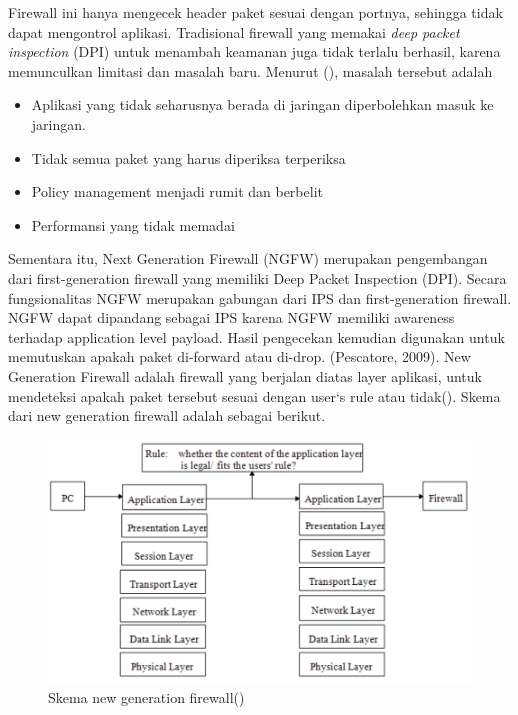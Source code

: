 Firewall ini hanya mengecek header paket sesuai dengan portnya, sehingga tidak dapat mengontrol aplikasi. Tradisional firewall yang memakai \textit{deep packet inspection} (DPI) untuk menambah keamanan juga tidak terlalu berhasil, karena memunculkan limitasi dan masalah baru. Menurut (\cite{miller2011next}), masalah tersebut adalah
\begin{itemize}
	\item Aplikasi yang tidak seharusnya berada di jaringan diperbolehkan masuk ke jaringan.
	\item Tidak semua paket yang harus diperiksa terperiksa
	\item Policy management menjadi rumit dan berbelit
	\item Performansi yang tidak memadai 
\end{itemize}

Sementara itu, Next Generation Firewall (NGFW) merupakan pengembangan dari first-generation firewall yang memiliki Deep Packet Inspection (DPI). Secara fungsionalitas NGFW merupakan gabungan dari IPS dan first-generation firewall. NGFW dapat dipandang sebagai IPS karena NGFW memiliki awareness terhadap application level payload. Hasil pengecekan kemudian digunakan untuk memutuskan apakah paket di-forward atau di-drop. (Pescatore, 2009). New Generation Firewall adalah firewall yang berjalan diatas layer aplikasi, untuk mendeteksi apakah paket tersebut sesuai dengan user`s rule atau tidak(\cite{zhong2012design}). Skema dari new generation firewall adalah sebagai berikut.
\begin{figure}[H]
	\centering
	\includegraphics[width=\textwidth]{resources/NGFW.png}
	\caption{Skema new generation firewall(\cite{zhong2012design})}
	\label{fig:new_generation_firewall}
\end{figure}

